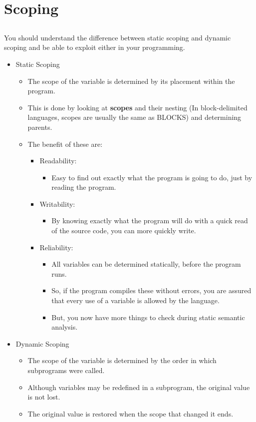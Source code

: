 \section{Scoping}\label{sec:Scoping}

\subsection{}
You should understand the difference between static scoping and dynamic scoping and be able to exploit either in your programming.

\begin{itemize}
\item Static Scoping
  \begin{itemize}[noitemsep]
  \item The scope of the variable is determined by its placement within the program.
  \item This is done by looking at \textbf{scopes} and their nesting (In block-delimited languages, scopes are usually the same as BLOCKS) and determining parents.
  \item The benefit of these are:
    \begin{itemize}[noitemsep]
    \item Readability:
      \begin{itemize}[noitemsep]
      \item Easy to find out exactly what the program is going to do, just by reading the program.
      \end{itemize}
    \item Writability:
      \begin{itemize}[noitemsep]
      \item By knowing exactly what the program will do with a quick read of the source code, you can more quickly write.
      \end{itemize}
    \item Reliability:
      \begin{itemize}[noitemsep]
      \item All variables can be determined statically, before the program runs.
      \item So, if the program compiles these without errors, you are assured that every use of a variable is allowed by the language.
      \item But, you now have more things to check during static semantic analysis.
      \end{itemize}
    \end{itemize}
  \end{itemize}

\item Dynamic Scoping
  \begin{itemize}[noitemsep]
  \item The scope of the variable is determined by the order in which subprograms were called.
  \item Although variables may be redefined in a subprogram, the original value is not lost.
  \item The original value is restored when the scope that changed it ends.
  \end{itemize}
\end{itemize}

